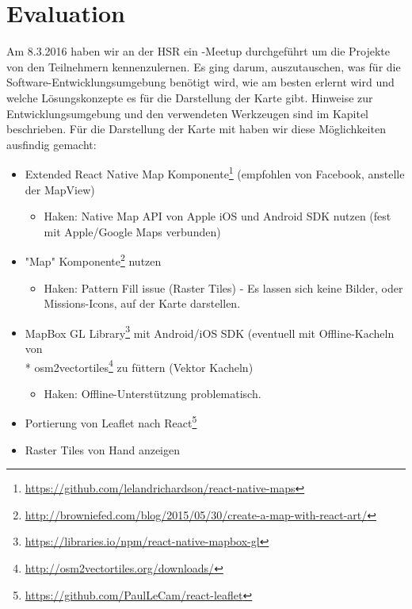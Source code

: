 \chapter{Evaluation}
\label{tb-evaluation}
Am 8.3.2016 haben wir an der HSR ein -Meetup durchgeführt um die Projekte von den Teilnehmern kennenzulernen. 
Es ging darum, auszutauschen, was für die Software-Entwicklungsumgebung benötigt wird, wie  am besten erlernt wird und welche Lösungskonzepte es für die Darstellung der Karte gibt.
Hinweise zur Entwicklungsumgebung und den verwendeten Werkzeugen sind im Kapitel  beschrieben.
Für die Darstellung der Karte mit  haben wir diese Möglichkeiten ausfindig gemacht:

\begin{itemize}
    \item Extended React Native Map Komponente\footnote{\url{https://github.com/lelandrichardson/react-native-maps}} (empfohlen von Facebook, anstelle der MapView)
    \begin{itemize}
    	\item Haken: Native Map API von Apple iOS und Android SDK nutzen (fest mit Apple/Google Maps verbunden)
	\end{itemize}
	
    \item {} "Map" Komponente\footnote{\url{http://browniefed.com/blog/2015/05/30/create-a-map-with-react-art/}} nutzen
    \begin{itemize}
    	\item Haken: Pattern Fill issue (Raster Tiles) - Es lassen sich keine Bilder, oder Missions-Icons, auf der Karte darstellen.
	\end{itemize}     

    \item MapBox GL Library\footnote{\url{https://libraries.io/npm/react-native-mapbox-gl}} mit Android/iOS SDK  (eventuell mit Offline-Kacheln von\\* osm2vectortiles\footnote{\url{http://osm2vectortiles.org/downloads/}} zu füttern (Vektor Kacheln)
    \begin{itemize}
    	\item Haken: Offline-Unterstützung problematisch.
	\end{itemize}   
	
    \item Portierung von Leaflet nach React\footnote{\url{https://github.com/PaulLeCam/react-leaflet}}
    \item Raster Tiles von Hand anzeigen
\end{itemize}

